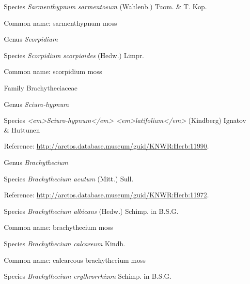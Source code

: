 \documentclass[9pt, article]{memoir}
\begin{document}
\begin{multicols}{2}
\vspace{6pt}\noindent\hspace{36pt}Species \textit{Sarmenthypnum sarmentosum} (Wahlenb.) Tuom. \& T. Kop.


Common name: sarmenthypnum moss

\vspace{6pt}\noindent\hspace{30pt}Genus \textit{Scorpidium}


\vspace{6pt}\noindent\hspace{36pt}Species \textit{Scorpidium scorpioides} (Hedw.) Limpr.


Common name: scorpidium moss

\vspace{6pt}\noindent\hspace{24pt}Family Brachytheciaceae


\vspace{6pt}\noindent\hspace{30pt}Genus \textit{Sciuro-hypnum}


\vspace{6pt}\noindent\hspace{36pt}Species \textit{<em>Sciuro-hypnum</em> <em>latifolium</em>} (Kindberg) Ignatov \& Huttunen


Reference: 
\url{http://arctos.database.museum/guid/KNWR:Herb:11990}.

\vspace{6pt}\noindent\hspace{30pt}Genus \textit{Brachythecium}


\vspace{6pt}\noindent\hspace{36pt}Species \textit{Brachythecium acutum} (Mitt.) Sull.


Reference: 
\url{http://arctos.database.museum/guid/KNWR:Herb:11972}.

\vspace{6pt}\noindent\hspace{36pt}Species \textit{Brachythecium albicans} (Hedw.) Schimp. in B.S.G.


Common name: brachythecium moss

\vspace{6pt}\noindent\hspace{36pt}Species \textit{Brachythecium calcareum} Kindb.


Common name: calcareous brachythecium moss

\vspace{6pt}\noindent\hspace{36pt}Species \textit{Brachythecium erythrorrhizon} Schimp. in B.S.G.



\end{multicols}
\end{document}

